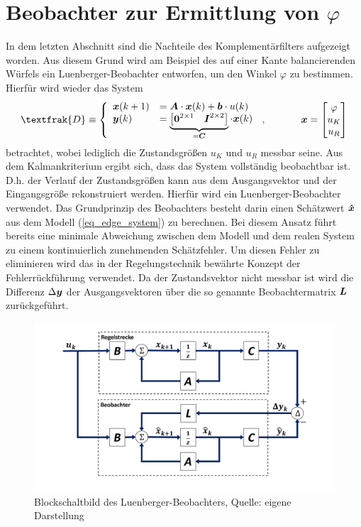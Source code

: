 \section{Beobachter zur Ermittlung von $\varphi$}
In dem letzten Abschnitt sind die Nachteile des Komplementärfilters aufgezeigt worden. Aus diesem Grund wird am Beispiel des auf einer Kante balancierenden Würfels ein Luenberger-Beobachter entworfen, um den Winkel $\varphi$ zu bestimmen. Hierfür wird wieder das System
\begin{equation}
\textfrak{D} \equiv \left\{ \begin{array}{ll}
\bs{x}(k+1) &= \bs{A}\cdot \bs{x}(k) + \bs{b}\cdot u(k)
\\
\bs{y}(k) &= \underbrace{\begin{bmatrix}
\bs{0}^{2\times 1} & \bs{I}^{2\times 2}
\end{bmatrix}}_{= \bs{C}} \cdot \bs{x}(k)
\end{array}\right.\,, \hspace{35pt} \bs{x}=\begin{bmatrix}
\varphi \\ u_K \\ u_R
\end{bmatrix}
\label{eq_edge_system}
\end{equation}
betrachtet, wobei lediglich die Zustandsgrößen $u_K$ und $u_R$ messbar seine. Aus dem Kalmankriterium ergibt sich, dass das System vollständig beobachtbar ist. D.h. der Verlauf der Zustandsgrößen kann aus dem Ausgangsvektor und der Eingangsgröße rekonstruiert werden. Hierfür wird ein Luenberger-Beobachter verwendet. Das Grundprinzip des Beobachters besteht darin einen Schätzwert $\boldsymbol{\hat{x}}$ aus dem Modell (\ref{eq_edge_system}) zu berechnen. Bei diesem Ansatz führt bereits eine minimale Abweichung zwischen dem Modell und dem realen System zu einem kontinuierlich zunehmenden Schätzfehler. Um diesen Fehler zu eliminieren wird das in der Regelungstechnik bewährte Konzept der Fehlerrückführung verwendet. Da der Zustandsvektor nicht messbar ist wird  die Differenz $\Delta \boldsymbol{y}$ der Ausgangsvektoren über die so genannte Beobachtermatrix $\boldsymbol{L}$ zurückgeführt.
\begin{figure}[h!]
\centering
\includegraphics[width=1\linewidth, trim={1cm 1cm 1cm 1cm}, clip]{img/Observer}
\caption{Blockschaltbild des Luenberger-Beobachters, Quelle: eigene Darstellung}
\end{figure}

